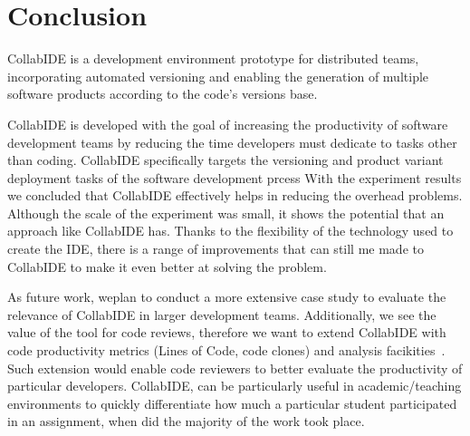 
\section{Conclusion}
\label{sec:conclusion}

CollabIDE is a development environment prototype for distributed teams, incorporating automated versioning and enabling the generation of multiple software products according to the code's versions base.

CollabIDE is developed with the goal of increasing the productivity of software development teams by reducing the time developers must dedicate to tasks other than  coding. CollabIDE specifically targets the versioning and product variant deployment tasks of the software development prcess
With the experiment results we concluded that CollabIDE effectively helps in reducing the overhead 
problems. Although the scale of the experiment was small, it shows the potential that an approach like 
CollabIDE has. Thanks to the flexibility of the technology used to create the IDE, there is a range of 
improvements that can still me made to CollabIDE to make it even better at solving the problem.  

As future work, weplan to conduct a more extensive case study to evaluate the relevance of CollabIDE in larger development teams. Additionally, we see the value of the tool for code reviews, therefore we want to extend CollabIDE with code productivity metrics (\eg Lines of Code, code clones) and analysis facikities~\cite{}. Such extension would enable code reviewers to better evaluate the productivity of particular developers. CollabIDE, can be particularly useful in academic/teaching environments to quickly differentiate how much a particular student participated in an assignment, when did the majority of the work took place.

\endinput
